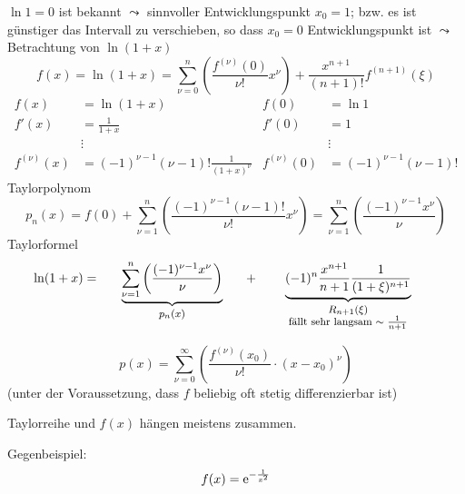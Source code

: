 \begin{example}[Logarithmus]\label{ex:logarithmus_taylor}
  $\ln 1 = 0$ ist bekannt $\leadsto$ sinnvoller Entwicklungspunkt $x_0 = 1$; bzw. es ist günstiger das Intervall zu verschieben, so dass $x_0 = 0$ Entwicklungspunkt ist $\leadsto$ Betrachtung von $\ln (1+x)$
  \[ f(x) = \ln (1+x) = \sum_{\nu = 0}^n \left( \frac{f^{(\nu)}(0)}{\nu !} x^\nu \right) + \frac{x^{n+1}}{(n+1)!} f^{(n+1)}(\xi) \]
  \begin{align*}
    f(x) &= \ln (1+x) & f(0) &= \ln 1 \\
    f'(x) &= \frac 1 {1+x} & f'(0) &= 1 \\
    &\vdots & &\vdots \\
    f^{(\nu)}(x) &= (-1)^{\nu-1} (\nu - 1)! \frac 1 {(1+x)^\nu} & f^{(\nu)}(0) &= (-1)^{\nu-1} (\nu -1)!
  \end{align*}
  Taylorpolynom
  \[
    p_n(x) = f(0) + \sum_{\nu = 1}^{n} \left( \frac{(-1)^{\nu-1} (\nu -1)!}{\nu !} x^\nu \right)
    = \sum_{\nu = 1}^{n} \left( \frac{(-1)^{\nu-1} x^\nu}{\nu} \right)
  \]
  Taylorformel
  \[
    \ln (1+x) = \underbrace{\sum_{\nu = 1}^{n} \left( \frac{(-1)^{\nu-1} x^\nu}{\nu} \right)}_{\parbox{4cm}{\centering\footnotesize $p_n(x)$}} + \underbrace{(-1)^n \frac{x^{n+1}}{n+1} \frac 1 {(1+\xi)^{n+1}}}_{\parbox{5cm}{\centering \footnotesize $R_{n+1}(\xi)$\\fällt sehr langsam $\sim \frac 1 {n+1}$}}
  \]
\end{example}

\begin{definition}[Taylorreihe]
  \[ p(x) = \sum_{\nu = 0}^\infty \left( \frac{f^{(\nu)}(x_0)}{\nu !} \cdot (x - x_0)^\nu \right) \]
  (unter der Voraussetzung, dass $f$ beliebig oft stetig differenzierbar ist)
\end{definition}

\begin{note}
  Taylorreihe und $f(x)$ hängen meistens zusammen.
\end{note}

\noindent Gegenbeispiel:
\[
  f(x) = \operatorname{e}^{-\frac 1 {x^2}}
\]